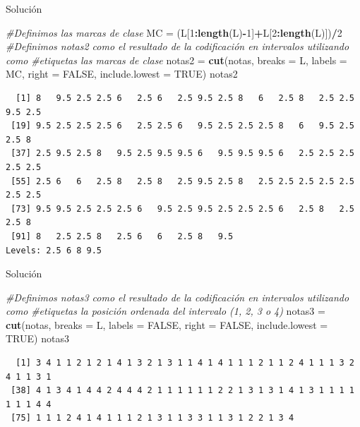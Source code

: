 \documentclass[
  ignorenonframetext,
]{beamer}
\newenvironment{Shaded}{\begin{snugshade}}{\end{snugshade}}
\newcommand{\CommentTok}[1]{\textcolor[rgb]{0.56,0.35,0.01}{\textit{#1}}}
\newcommand{\DataTypeTok}[1]{\textcolor[rgb]{0.13,0.29,0.53}{#1}}
\newcommand{\DecValTok}[1]{\textcolor[rgb]{0.00,0.00,0.81}{#1}}
\newcommand{\KeywordTok}[1]{\textcolor[rgb]{0.13,0.29,0.53}{\textbf{#1}}}
\newcommand{\NormalTok}[1]{#1}
\newcommand{\OperatorTok}[1]{\textcolor[rgb]{0.81,0.36,0.00}{\textbf{#1}}}
\newcommand{\OtherTok}[1]{\textcolor[rgb]{0.56,0.35,0.01}{#1}}
\newcommand{\StringTok}[1]{\textcolor[rgb]{0.31,0.60,0.02}{#1}}
\begin{document}
\begin{frame}[fragile]{Solución}
\protect\hypertarget{soluciuxf3n-18}{}

\begin{Shaded}
\begin{Highlighting}[]
\CommentTok{#Definimos las marcas de clase}
\NormalTok{MC =}\StringTok{ }\NormalTok{(L[}\DecValTok{1}\OperatorTok{:}\KeywordTok{length}\NormalTok{(L)}\OperatorTok{-}\DecValTok{1}\NormalTok{]}\OperatorTok{+}\NormalTok{L[}\DecValTok{2}\OperatorTok{:}\KeywordTok{length}\NormalTok{(L)])}\OperatorTok{/}\DecValTok{2}
\CommentTok{#Definimos notas2 como el resultado de la codificación en intervalos utilizando como }
\CommentTok{#etiquetas las marcas de clase}
\NormalTok{notas2 =}\StringTok{ }\KeywordTok{cut}\NormalTok{(notas, }\DataTypeTok{breaks =}\NormalTok{ L, }\DataTypeTok{labels =}\NormalTok{ MC, }\DataTypeTok{right =} \OtherTok{FALSE}\NormalTok{, }\DataTypeTok{include.lowest =} \OtherTok{TRUE}\NormalTok{)}
\NormalTok{notas2}
\end{Highlighting}
\end{Shaded}

\begin{verbatim}
  [1] 8   9.5 2.5 2.5 6   2.5 6   2.5 9.5 2.5 8   6   2.5 8   2.5 2.5 9.5 2.5
 [19] 9.5 2.5 2.5 2.5 6   2.5 2.5 6   9.5 2.5 2.5 2.5 8   6   9.5 2.5 2.5 8  
 [37] 2.5 9.5 2.5 8   9.5 2.5 9.5 9.5 6   9.5 9.5 9.5 6   2.5 2.5 2.5 2.5 2.5
 [55] 2.5 6   6   2.5 8   2.5 8   2.5 9.5 2.5 8   2.5 2.5 2.5 2.5 2.5 2.5 2.5
 [73] 9.5 9.5 2.5 2.5 2.5 6   9.5 2.5 9.5 2.5 2.5 2.5 6   2.5 8   2.5 2.5 8  
 [91] 8   2.5 2.5 8   2.5 6   6   2.5 8   9.5
Levels: 2.5 6 8 9.5
\end{verbatim}

\end{frame}

\begin{frame}[fragile]{Solución}
\protect\hypertarget{soluciuxf3n-19}{}

\begin{Shaded}
\begin{Highlighting}[]
\CommentTok{#Definimos notas3 como el resultado de la codificación en intervalos utilizando como }
\CommentTok{#etiquetas la posición ordenada del intervalo (1, 2, 3 o 4)}
\NormalTok{notas3 =}\StringTok{ }\KeywordTok{cut}\NormalTok{(notas, }\DataTypeTok{breaks =}\NormalTok{ L, }\DataTypeTok{labels =} \OtherTok{FALSE}\NormalTok{, }\DataTypeTok{right =} \OtherTok{FALSE}\NormalTok{, }\DataTypeTok{include.lowest =} \OtherTok{TRUE}\NormalTok{)}
\NormalTok{notas3}
\end{Highlighting}
\end{Shaded}

\begin{verbatim}
  [1] 3 4 1 1 2 1 2 1 4 1 3 2 1 3 1 1 4 1 4 1 1 1 2 1 1 2 4 1 1 1 3 2 4 1 1 3 1
 [38] 4 1 3 4 1 4 4 2 4 4 4 2 1 1 1 1 1 1 2 2 1 3 1 3 1 4 1 3 1 1 1 1 1 1 1 4 4
 [75] 1 1 1 2 4 1 4 1 1 1 2 1 3 1 1 3 3 1 1 3 1 2 2 1 3 4
\end{verbatim}

\end{frame}
\end{document}
